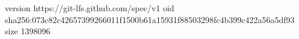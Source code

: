 version https://git-lfs.github.com/spec/v1
oid sha256:073c82c42657399266011f1500b61a15931f88503298fc4b399c422a56a5df93
size 1398096
